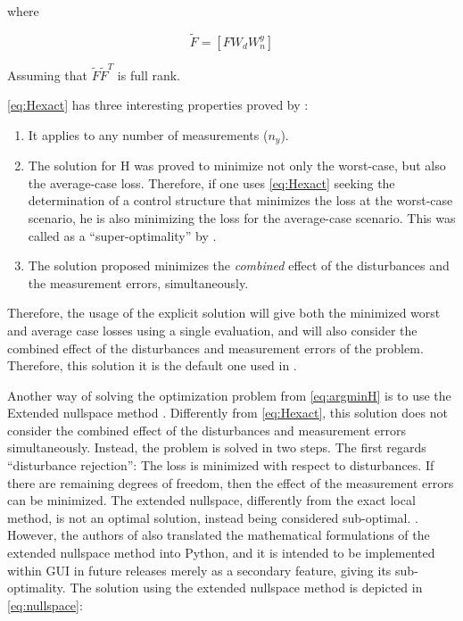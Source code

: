 \documentclass[../msc-thesis.tex]{subfiles}
\begin{document}
where

\begin{equation}
	\tilde{F}=\left[F W_{d} W_{n}^{y}\right]
	\label{eq:Ftilde}
\end{equation}

Assuming that $\tilde{F} \tilde{F}^{T}$ is full rank.

\autoref{eq:Hexact} has three interesting properties proved by 
\textcite{Alstad2009}: 

\begin{enumerate}
	\item It applies to any number of measurements ($n_{y}$).
	
	\item The solution for H was proved to minimize not only the worst-case, but 
	also the average-case loss. Therefore, if one uses \autoref{eq:Hexact} 
	seeking the determination of a control structure that minimizes the loss at 
	the worst-case scenario, he is also minimizing the loss for the average-case 
	scenario. This was called as a ``super-optimality'' by \textcite{Alstad2009}.

	\item The solution proposed minimizes the \textit{combined} effect of the 
	disturbances and the measurement errors, simultaneously.
\end{enumerate}

Therefore, the usage of the explicit solution will give both the minimized worst 
and average case losses using a single evaluation, and will also consider the 
combined effect of the disturbances and measurement errors of the problem. 
Therefore, this solution it is the default one used in \mtc.

Another way of solving the optimization problem from \autoref{eq:argminH} is to 
use the Extended nullspace method \cite{Alstad2009}. Differently from 
\autoref{eq:Hexact}, this solution does not consider the combined effect of the 
disturbances and measurement errors simultaneously. Instead, the problem is 
solved in two steps. The first regards ``disturbance rejection'': The loss is 
minimized with respect to disturbances. If there are remaining degrees of 
freedom, then the effect of the measurement errors can be minimized. The 
extended nullspace, differently from the exact local method, is not an optimal 
solution, instead being considered sub-optimal. \cite{Alstad2007,Alstad2009}. 
However, the authors of \textcite{Alves2018} also translated the mathematical 
formulations of the extended nullspace method into Python, and it is intended 
to be implemented within \mtc GUI in future releases merely as a secondary 
feature, giving its sub-optimality. The solution using the extended nullspace 
method is depicted in \autoref{eq:nullspace}:
\end{document}
